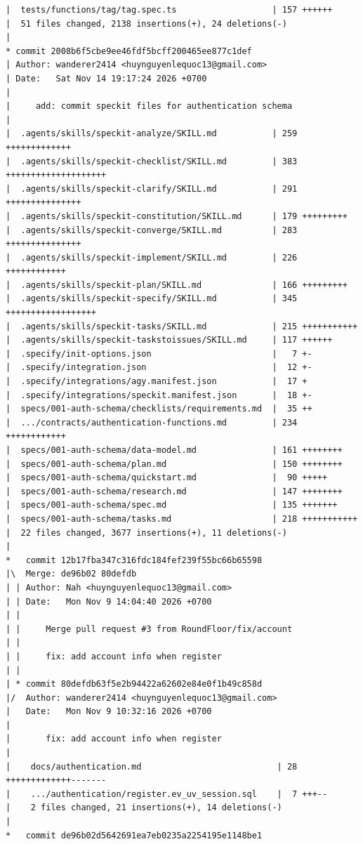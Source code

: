 \documentclass[12pt]{article}
\begin{document}
\begin{lstlisting}[numbers=none,breaklines=true]
|  tests/functions/tag/tag.spec.ts                   | 157 ++++++
|  51 files changed, 2138 insertions(+), 24 deletions(-)
|
* commit 2008b6f5cbe9ee46fdf5bcff200465ee877c1def
| Author: wanderer2414 <huynguyenlequoc13@gmail.com>
| Date:   Sat Nov 14 19:17:24 2026 +0700
|
|     add: commit speckit files for authentication schema
|
|  .agents/skills/speckit-analyze/SKILL.md           | 259 +++++++++++++
|  .agents/skills/speckit-checklist/SKILL.md         | 383 ++++++++++++++++++++
|  .agents/skills/speckit-clarify/SKILL.md           | 291 +++++++++++++++
|  .agents/skills/speckit-constitution/SKILL.md      | 179 +++++++++
|  .agents/skills/speckit-converge/SKILL.md          | 283 +++++++++++++++
|  .agents/skills/speckit-implement/SKILL.md         | 226 ++++++++++++
|  .agents/skills/speckit-plan/SKILL.md              | 166 +++++++++
|  .agents/skills/speckit-specify/SKILL.md           | 345 ++++++++++++++++++
|  .agents/skills/speckit-tasks/SKILL.md             | 215 +++++++++++
|  .agents/skills/speckit-taskstoissues/SKILL.md     | 117 ++++++
|  .specify/init-options.json                        |   7 +-
|  .specify/integration.json                         |  12 +-
|  .specify/integrations/agy.manifest.json           |  17 +
|  .specify/integrations/speckit.manifest.json       |  18 +-
|  specs/001-auth-schema/checklists/requirements.md  |  35 ++
|  .../contracts/authentication-functions.md         | 234 ++++++++++++
|  specs/001-auth-schema/data-model.md               | 161 ++++++++
|  specs/001-auth-schema/plan.md                     | 150 ++++++++
|  specs/001-auth-schema/quickstart.md               |  90 +++++
|  specs/001-auth-schema/research.md                 | 147 ++++++++
|  specs/001-auth-schema/spec.md                     | 135 +++++++
|  specs/001-auth-schema/tasks.md                    | 218 +++++++++++
|  22 files changed, 3677 insertions(+), 11 deletions(-)
|
*   commit 12b17fba347c316fdc184fef239f55bc66b65598
|\  Merge: de96b02 80defdb
| | Author: Nah <huynguyenlequoc13@gmail.com>
| | Date:   Mon Nov 9 14:04:40 2026 +0700
| |
| |     Merge pull request #3 from RoundFloor/fix/account
| |
| |     fix: add account info when register
| |
| * commit 80defdb63f5e2b94422a62602e84e0f1b49c858d
|/  Author: wanderer2414 <huynguyenlequoc13@gmail.com>
|   Date:   Mon Nov 9 10:32:16 2026 +0700
|
|       fix: add account info when register
|
|    docs/authentication.md                           | 28 +++++++++++++-------
|    .../authentication/register.ev_uv_session.sql    |  7 +++--
|    2 files changed, 21 insertions(+), 14 deletions(-)
|
*   commit de96b02d5642691ea7eb0235a2254195e1148be1

\end{lstlisting}
\end{document}
